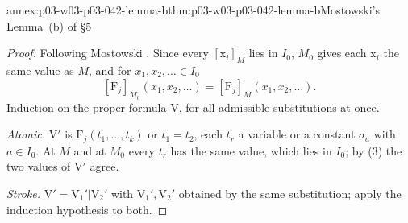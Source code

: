 \begin{annexitem}{annex:p03-w03-p03-042-lemma-b}{thm:p03-w03-p03-042-lemma-b}{Mostowski's Lemma~(b) of \S5}
\begin{proof}
Following Mostowski \cite[pp.~22--23]{Mostowski1957}.  Since every
\([\mathrm x_i]_M\) lies in \(I_0\), \(M_0\) gives each \(\mathrm x_i\) the
same value as \(M\), and for \(x_1,x_2,\ldots\in I_0\)
\[
 [\mathrm F_j]_{M_0}(x_1,x_2,\ldots)=[\mathrm F_j]_M(x_1,x_2,\ldots).
 \tag{3}
\]
Induction on the proper formula \(\mathrm V\), for all admissible
substitutions at once.

\emph{Atomic.}  \(\mathrm V'\) is \(\mathrm F_j(t_1,\ldots,t_k)\) or
\(t_1=t_2\), each \(t_r\) a variable or a constant \(\sigma_a\) with
\(a\in I_0\).  At \(M\) and at \(M_0\) every \(t_r\) has the same value,
which lies in \(I_0\); by (3) the two values of \(\mathrm V'\) agree.

\emph{Stroke.}  \(\mathrm V'=\mathrm V_1'|\mathrm V_2'\) with
\(\mathrm V_1',\mathrm V_2'\) obtained by the same substitution; apply the
induction hypothesis to both.


\end{proof}
\end{annexitem}
